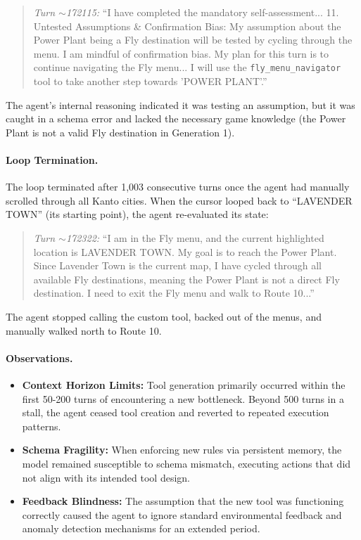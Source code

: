 \documentclass[11pt]{article}
\begin{document}
\begin{quote}
\emph{Turn $\sim$172115:} ``I have completed the mandatory self-assessment... 11. Untested Assumptions \& Confirmation Bias: My assumption about the Power Plant being a Fly destination will be tested by cycling through the menu. I am mindful of confirmation bias. My plan for this turn is to continue navigating the Fly menu... I will use the \texttt{fly\_menu\_navigator} tool to take another step towards 'POWER PLANT'.''
\end{quote}

The agent's internal reasoning indicated it was testing an assumption, but it was caught in a schema error and lacked the necessary game knowledge (the Power Plant is not a valid Fly destination in Generation 1).

\paragraph{Loop Termination.} The loop terminated after 1{,}003 consecutive turns once the agent had manually scrolled through all Kanto cities. When the cursor looped back to ``LAVENDER TOWN'' (its starting point), the agent re-evaluated its state:

\begin{quote}
\emph{Turn $\sim$172322:} ``I am in the Fly menu, and the current highlighted location is LAVENDER TOWN. My goal is to reach the Power Plant. Since Lavender Town is the current map, I have cycled through all available Fly destinations, meaning the Power Plant is not a direct Fly destination. I need to exit the Fly menu and walk to Route 10...''
\end{quote}

The agent stopped calling the custom tool, backed out of the menus, and manually walked north to Route 10.

\paragraph{Observations.}
\begin{itemize}
    \item \textbf{Context Horizon Limits:} Tool generation primarily occurred within the first 50-200 turns of encountering a new bottleneck. Beyond 500 turns in a stall, the agent ceased tool creation and reverted to repeated execution patterns.
    \item \textbf{Schema Fragility:} When enforcing new rules via persistent memory, the model remained susceptible to schema mismatch, executing actions that did not align with its intended tool design.
    \item \textbf{Feedback Blindness:} The assumption that the new tool was functioning correctly caused the agent to ignore standard environmental feedback and anomaly detection mechanisms for an extended period.
\end{itemize}
\end{document}
